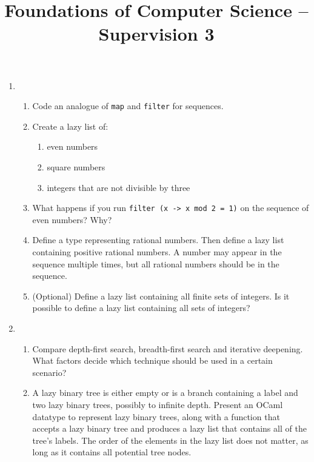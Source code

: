 \documentclass[11pt,a4paper]{article}
\title{Foundations of Computer Science -- Supervision 3}
\author{}
\date{}
\begin{document}
\maketitle

\begin{enumerate}

\item
\begin{enumerate}
    \item Code an analogue of \verb|map| and \verb|filter| for sequences.

    \item Create a lazy list of:
    \begin{enumerate}
        \item even numbers
        \item square numbers
        \item integers that are not divisible by three
    \end{enumerate}

    \item What happens if you run \verb|filter (x -> x mod 2 = 1)| on the sequence of even numbers? Why?

    \item Define a type representing rational numbers.  
    Then define a lazy list containing positive rational numbers.  
    A number may appear in the sequence multiple times, but all rational numbers should be in the sequence.

    \item (Optional) Define a lazy list containing all finite sets of integers.  
    Is it possible to define a lazy list containing all sets of integers?
\end{enumerate}

\item
\begin{enumerate}
    \item Compare depth-first search, breadth-first search and iterative deepening.  
    What factors decide which technique should be used in a certain scenario?

    \item A lazy binary tree is either empty or is a branch containing a label and two lazy binary trees, possibly to infinite depth.  
    Present an OCaml datatype to represent lazy binary trees, along with a function that accepts a lazy binary tree and produces a lazy list that contains all of the tree’s labels.  
    The order of the elements in the lazy list does not matter, as long as it contains all potential tree nodes.


\end{enumerate}
\end{enumerate}
\end{document}
